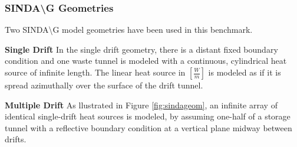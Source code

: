\begin{frame}[ctb!]
  \frametitle{SINDA{\textbackslash}G Geometries}

Two SINDA{\textbackslash}G model geometries have been used in this benchmark.  

\textbf{Single Drift}
In the single drift geometry, there is a distant fixed boundary condition and 
one waste tunnel is modeled with a continuous, cylindrical heat source of 
infinite length. The linear heat source in $[\frac{W}{m}]$ is modeled as if it 
is spread azimuthally over the surface of the drift tunnel. 

\textbf{Multiple Drift}
As llustrated in Figure \ref{fig:sindageom}, an infinite array of identical single-drift heat sources is modeled,
by assuming one-half of a storage tunnel with a reflective boundary condition at a vertical
plane midway between drifts. 

\end{frame}
